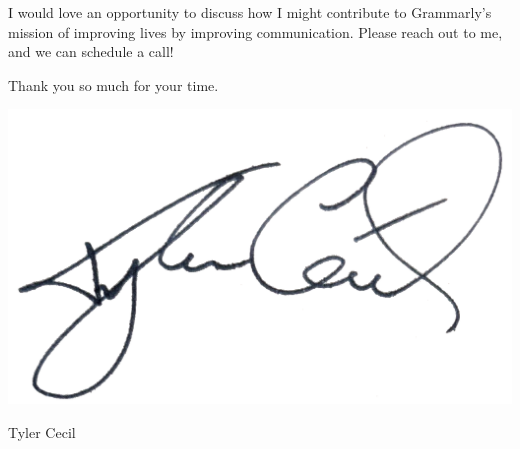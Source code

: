 \documentclass[sans, a4paper]{article}
\begin{document}
\begin{adjustwidth}{40pt}{40pt}
  I would love an opportunity to discuss how I might contribute to Grammarly's
  mission of improving lives by improving communication. Please reach out to
  me, and we can schedule a call!  \bigskip

  Thank you so much for your time.

  \vspace{-0.75em}
  \includegraphics[height=5\baselineskip]{sig}
  \vspace{-0.75em}

  Tyler Cecil
\end{adjustwidth}
\end{document}
